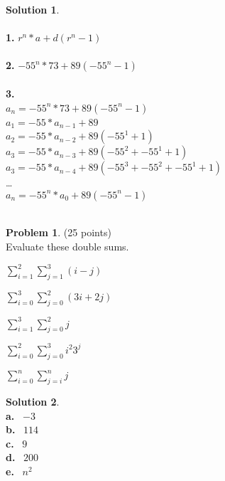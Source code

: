 \documentclass{article}
\theoremstyle{definition}
\newtheorem{problem}{Problem}
\newtheorem*{solution}{Solution}
\begin{document}
\begin{solution}\ \\
\ \\
\textbf{1.} $r^n*a + d(r^n - 1)$\ \\
\ \\
\textbf{2.} $-55^n*73 + 89(-55^n - 1)$\ \\
\ \\
\textbf{3.} \ \\$a_n = -55^n * 73 + 89(-55^n - 1)$ \ \\
$a_1 = -55 * a_{n-1} + 89$\ \\
$a_2 =  -55 * a_{n-2} + 89(-55^1 + 1)$\ \\
$a_3 = -55 * a_{n-3} + 89(-55^2 + -55^1 + 1)$\ \\
$a_3 = -55 * a_{n-4} + 89(-55^3 + -55^2 + -55^1 + 1)$\ \\
\dots \ \\ $a_n = -55^n * a_0 + 89(-55^n - 1)$\\\
\end{solution}

\newpage

\begin{problem} (25 points)\\
Evaluate these double sums.
\begin{compactenum}
\renewcommand{\theenumi}{\alph{enumi}}
\item $\displaystyle \sum_{i=1}^2 \sum_{j=1}^3 (i-j)$
\item $\displaystyle \sum_{i=0}^3 \sum_{j=0}^2 (3i+2j)$
\item $\displaystyle \sum_{i=1}^3 \sum_{j=0}^2 j$
\item $\displaystyle \sum_{i=0}^2 \sum_{j=0}^3 i^2 3^j$
\item $\displaystyle \sum_{i=0}^n \sum_{j=i}^n j$
\end{compactenum}
\end{problem}

\begin{solution}\ \\
\textbf{a.} \ $-3$\ \\
\textbf{b.} \ $114$ \ \\
\textbf{c.} \ $9$ \ \\
\textbf{d.} \ $200$ \ \\
\textbf{e.} \ $n^2$ \ \\


\end{solution}
\end{document}
